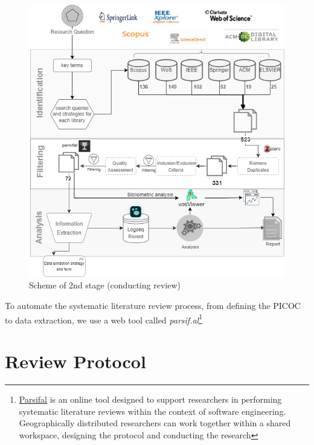 \begin{figure}[h!]
    \centering
    \includegraphics[width=1\textwidth]{images/slrmethoddiagram_v2.png}
    \caption{Scheme of 2nd stage (conducting review) }
    \label{fig:slr-proc}
\end{figure}


To automate the systematic literature review process, from defining the PICOC to data extraction, we use a web tool called \textit{parsif.al}\footnote{\href{https://parsif.al}{Parsifal} is an online tool designed to support researchers in performing systematic literature reviews within the context of software engineering. Geographically distributed researchers can work together within a shared workspace, designing the protocol and conducting the research}

\section{Review Protocol}




